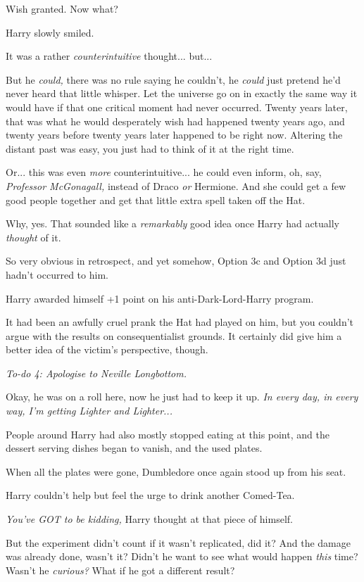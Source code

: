 Wish granted. Now what?

Harry slowly smiled.

It was a rather \emph{counterintuitive} thought... but...

But he \emph{could,} there was no rule saying he couldn't, he
\emph{could} just pretend he'd never heard that little whisper. Let the
universe go on in exactly the same way it would have if that one
critical moment had never occurred. Twenty years later, that was what he
would desperately wish had happened twenty years ago, and twenty years
before twenty years later happened to be right now. Altering the distant
past was easy, you just had to think of it at the right time.

Or... this was even \emph{more} counterintuitive... he could
even inform, oh, say, \emph{Professor McGonagall,} instead of Draco
\emph{or} Hermione. And she could get a few good people together and get
that little extra spell taken off the Hat.

Why, yes. That sounded like a \emph{remarkably} good idea once Harry had
actually \emph{thought} of it.

So very obvious in retrospect, and yet somehow, Option 3c and Option 3d
just hadn't occurred to him.

Harry awarded himself +1 point on his anti-Dark-Lord-Harry program.

It had been an awfully cruel prank the Hat had played on him, but you
couldn't argue with the results on consequentialist grounds. It
certainly did give him a better idea of the victim's perspective,
though.

\emph{To-do 4: Apologise to Neville Longbottom.}

Okay, he was on a roll here, now he just had to keep it up. \emph{In
every day, in every way, I'm getting Lighter and Lighter...}

People around Harry had also mostly stopped eating at this point, and
the dessert serving dishes began to vanish, and the used plates.

When all the plates were gone, Dumbledore once again stood up from his
seat.

Harry couldn't help but feel the urge to drink another Comed-Tea.

\emph{You've GOT to be kidding,} Harry thought at that piece of himself.

But the experiment didn't count if it wasn't replicated, did it? And the
damage was already done, wasn't it? Didn't he want to see what would
happen \emph{this} time? Wasn't he \emph{curious?} What if he got a
different result?

